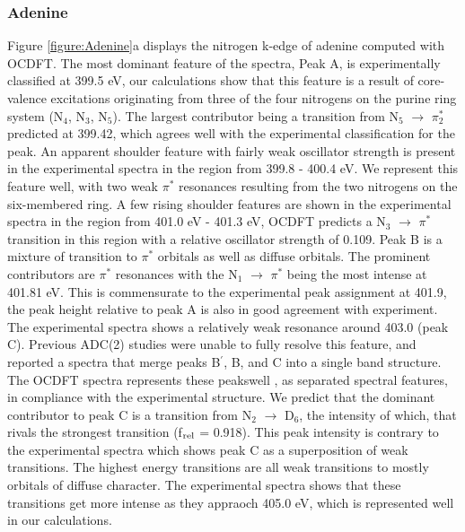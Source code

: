 \documentclass[12pt]{article}
\begin{document}
\subsubsection{Adenine} Figure \ref{figure:Adenine}a displays the nitrogen k-edge of adenine computed with OCDFT. The most dominant feature of the spectra, Peak A, is experimentally classified at 399.5 eV, our calculations show that this feature is a result of core-valence excitations originating from three of the four nitrogens on the purine ring system (N$_4$, N$_3$, N$_5$). The largest contributor being a transition from N$_5$ $\rightarrow$ $\pi_2^*$ predicted at 399.42, which agrees well with the experimental classification for the peak. An apparent shoulder feature with fairly weak oscillator strength is present in the experimental spectra in the region from 399.8 - 400.4 eV. We represent this feature well, with two weak $\pi^*$ resonances resulting from the two nitrogens on the six-membered ring. A few rising shoulder features are shown in the experimental spectra in the region from 401.0 eV - 401.3 eV, OCDFT predicts a N$_3$ $\rightarrow$ $\pi^*$ transition in this region with a relative oscillator strength of 0.109. Peak B is a mixture of transition to $\pi^*$ orbitals as well as diffuse orbitals. The prominent contributors are $\pi^*$ resonances with the N$_1$ $\rightarrow$ $\pi^*$ being the most intense at 401.81 eV. This is commensurate to the experimental peak assignment at 401.9, the peak height relative to peak A is also in good agreement with experiment. The experimental spectra shows a relatively weak resonance around 403.0 (peak C). Previous ADC(2) studies were unable to fully resolve this feature, and reported a spectra that merge peaks B$^{\prime}$, B, and C into a single band structure. The OCDFT spectra represents these peakswell , as separated spectral features, in compliance with the experimental structure. We predict that the dominant contributor to peak C is a transition from N$_2$ $\rightarrow$ D$_6$, the intensity of which, that rivals the strongest transition (f$_{\rm rel}$ = 0.918). This peak intensity is contrary to the experimental spectra which shows peak C  as a superposition of weak transitions. The highest energy transitions are all weak transitions to mostly orbitals of diffuse character. The experimental spectra shows that these transitions get more intense as they appraoch 405.0 eV, which is represented well in our calculations. \\
\end{document}
